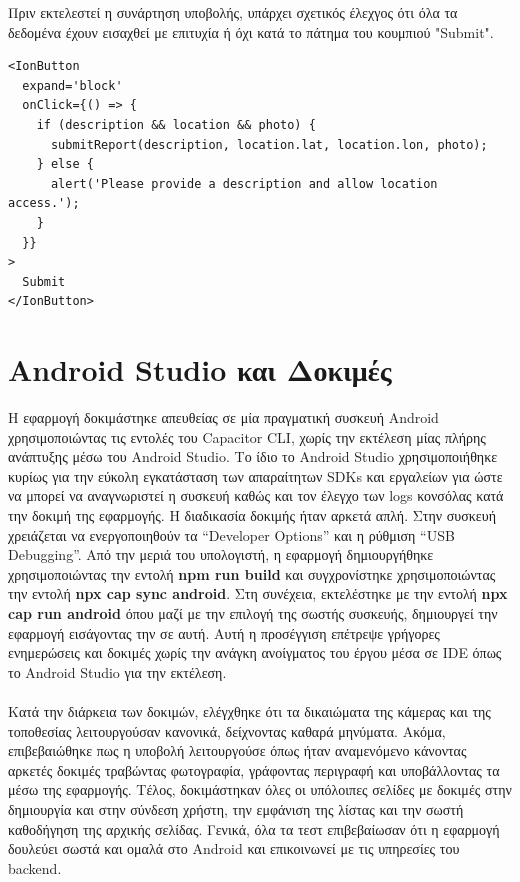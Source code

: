 Πριν εκτελεστεί η συνάρτηση υποβολής, υπάρχει σχετικός έλεχγος ότι όλα τα δεδομένα έχουν εισαχθεί με επιτυχία ή όχι κατά το πάτημα του κουμπιού "Submit".
\\
\begin{lstlisting}
<IonButton
  expand='block'
  onClick={() => {
    if (description && location && photo) {
      submitReport(description, location.lat, location.lon, photo);
    } else {
      alert('Please provide a description and allow location access.');
    }
  }}
>
  Submit
</IonButton>
\end{lstlisting}

\section{Android Studio και Δοκιμές}
Η εφαρμογή δοκιμάστηκε απευθείας σε μία πραγματική συσκευή Android χρησιμοποιώντας τις εντολές του Capacitor CLI, χωρίς την εκτέλεση μίας πλήρης ανάπτυξης μέσω του Android Studio. Το ίδιο το Android Studio χρησιμοποιήθηκε κυρίως για την εύκολη εγκατάσταση των απαραίτητων SDKs και εργαλείων για ώστε να μπορεί να αναγνωριστεί η συσκευή καθώς και τον έλεγχο των logs κονσόλας κατά την δοκιμή της εφαρμογής. Η διαδικασία δοκιμής ήταν αρκετά απλή. Στην συσκευή χρειάζεται να ενεργοποιηθούν τα “Developer Options” και η ρύθμιση “USB Debugging”. Από την μεριά του υπολογιστή, η εφαρμογή δημιουργήθηκε χρησιμοποιώντας την εντολή \textbf{npm run build} και συγχρονίστηκε χρησιμοποιώντας την εντολή \textbf{npx cap sync android}. Στη συνέχεια, εκτελέστηκε με την εντολή \textbf{npx cap run android} όπου μαζί με την επιλογή της σωστής συσκευής, δημιουργεί την εφαρμογή εισάγοντας την σε αυτή. Αυτή η προσέγγιση επέτρεψε γρήγορες ενημερώσεις και δοκιμές χωρίς την ανάγκη ανοίγματος του έργου μέσα σε IDE όπως το Android Studio για την εκτέλεση. 
\\
\\
Κατά την διάρκεια των δοκιμών, ελέγχθηκε ότι τα δικαιώματα της κάμερας και της τοποθεσίας λειτουργούσαν κανονικά, δείχνοντας καθαρά μηνύματα. Ακόμα, επιβεβαιώθηκε πως η υποβολή λειτουργούσε όπως ήταν αναμενόμενο κάνοντας αρκετές δοκιμές τραβώντας φωτογραφία, γράφοντας περιγραφή και υποβάλλοντας τα μέσω της εφαρμογής. Τέλος, δοκιμάστηκαν όλες οι υπόλοιπες σελίδες με δοκιμές στην δημιουργία και στην σύνδεση χρήστη, την εμφάνιση της λίστας και την σωστή καθοδήγηση της αρχικής σελίδας. Γενικά, όλα τα τεστ επιβεβαίωσαν ότι η εφαρμογή δουλεύει σωστά και ομαλά στο Android και επικοινωνεί με τις υπηρεσίες του backend.
\\
